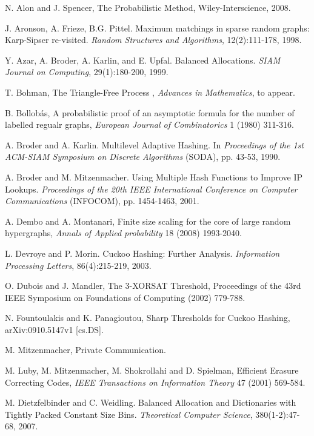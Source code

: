 \documentclass[11pt]{article}
\begin{document}
\begin{thebibliography}{100}

 N. Alon and J. Spencer, The Probabilistic Method, Wiley-Interscience, 2008.

 J. Aronson, A. Frieze, B.G. Pittel. Maximum matchings in
  sparse random graphs: Karp-Sipser re-visited. \emph{Random
    Structures and Algorithms}, 12(2):111-178, 1998.

 Y. Azar, A. Broder, A. Karlin, and E. Upfal. Balanced
    Allocations. \emph{SIAM Journal on Computing}, 29(1):180-200,
    1999.

 T. Bohman, The Triangle-Free Process , {\em Advances in Mathematics}, to appear.

 B. Bollob\'as, A probabilistic proof of an asymptotic formula for the number of labelled regualr graphs,
{\em European Journal of Combinatorics} 1 (1980) 311-316.

 A. Broder and A. Karlin. Multilevel Adaptive Hashing. In
    \emph{Proceedings of the 1st ACM-SIAM Symposium on Discrete
    Algorithms} (SODA), pp. 43-53, 1990.

 A. Broder and M. Mitzenmacher. Using Multiple Hash
    Functions to Improve IP Lookups. \emph{Proceedings of the 20th
    IEEE International Conference on Computer Communications}
    (INFOCOM), pp. 1454-1463, 2001.

 A. Dembo and A. Montanari, Finite size scaling for the core of large random hypergraphs,
{\em Annals of Applied probability} 18 (2008) 1993-2040.

 L. Devroye and P. Morin.  Cuckoo Hashing: Further
    Analysis. \emph{Information Processing Letters}, 86(4):215-219,
    2003.

 O. Dubois and J. Mandler, The 3-XORSAT Threshold, Proceedings of the 43rd IEEE Symposium
on Foundations of Computing (2002) 779-788.

 N. Fountoulakis and K. Panagioutou, Sharp Thresholds for Cuckoo Hashing, arXiv:0910.5147v1 [cs.DS].

 M. Mitzenmacher, Private Communication.

 M. Luby, M. Mitzenmacher, M. Shokrollahi and D. Spielman, 
Efficient Erasure Correcting Codes, {\em IEEE Transactions on Information Theory} 47 (2001) 569-584.

 M. Dietzfelbinder and C. Weidling.  Balanced Allocation
    and Dictionaries with Tightly Packed Constant Size Bins.
    \emph{Theoretical Computer Science}, 380(1-2):47-68, 2007.


\end{thebibliography}
\end{document}
